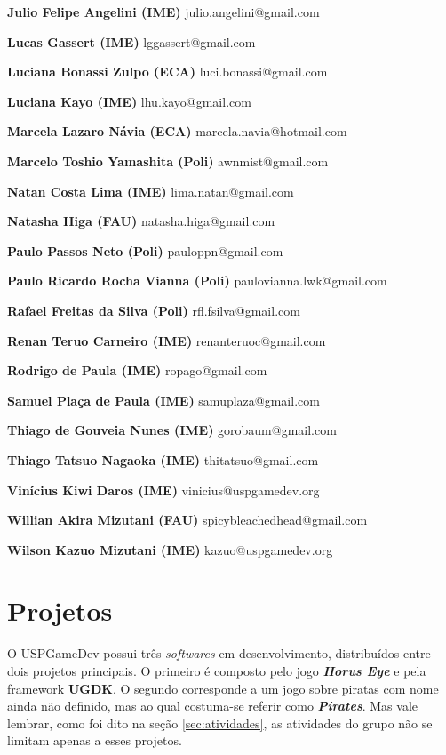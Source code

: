 \documentclass[12pt,onecolumn,a4paper]{article}
\begin{document}
\begin{list}{}
        \item[\bf Julio Felipe Angelini (IME)] julio.angelini@gmail.com
        \item[\bf Lucas Gassert (IME)] lggassert@gmail.com
        \item[\bf Luciana Bonassi Zulpo (ECA)] luci.bonassi@gmail.com
        \item[\bf Luciana Kayo (IME)] lhu.kayo@gmail.com
        \item[\bf Marcela Lazaro Návia (ECA)] marcela.navia@hotmail.com
        \item[\bf Marcelo Toshio Yamashita (Poli)] awnmist@gmail.com
        \item[\bf Natan Costa Lima (IME)] lima.natan@gmail.com
        \item[\bf Natasha Higa (FAU)] natasha.higa@gmail.com
        \item[\bf Paulo Passos Neto (Poli)] pauloppn@gmail.com
        \item[\bf Paulo Ricardo Rocha Vianna (Poli)] paulovianna.lwk@gmail.com
        \item[\bf Rafael Freitas da Silva (Poli)] rfl.fsilva@gmail.com
        \item[\bf Renan Teruo Carneiro (IME)] renanteruoc@gmail.com
        \item[\bf Rodrigo de Paula (IME)] ropago@gmail.com
        \item[\bf Samuel Plaça de Paula (IME)] samuplaza@gmail.com
        \item[\bf Thiago de Gouveia Nunes (IME)] gorobaum@gmail.com
        \item[\bf Thiago Tatsuo Nagaoka (IME)] thitatsuo@gmail.com
        \item[\bf Vinícius Kiwi Daros (IME)]  vinicius@uspgamedev.org
        \item[\bf Willian Akira Mizutani (FAU)] spicybleachedhead@gmail.com
        \item[\bf Wilson Kazuo Mizutani (IME)] kazuo@uspgamedev.org
    
    \end{list}

\clearpage
\section{\LARGE Projetos}
    O USPGameDev possui três \textit{softwares} em desenvolvimento, distribuídos entre dois projetos
    principais. O primeiro é composto pelo jogo \textit{\textbf{Horus Eye}} e pela framework
    \textbf{UGDK}. O segundo corresponde a um jogo sobre piratas com nome ainda não definido, mas ao
    qual costuma-se referir como \textit{\textbf{Pirates}}. Mas vale lembrar, como foi dito na seção
    \ref{sec:atividades}, as atividades do grupo não se limitam apenas a esses projetos.
    
\end{document}
